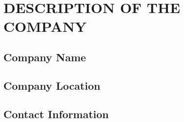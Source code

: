 \chapter{DESCRIPTION OF THE COMPANY}

\section{Company Name}

\section{Company Location}

\section{Contact Information}